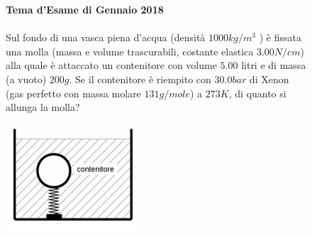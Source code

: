 \begin{figure}[h!]
    \textbf{Tema d'Esame di Gennaio 2018}\\ \\
    Sul fondo di una vasca piena d'acqua (densità $1000 kg/m^3$
    ) è fissata una molla (massa e volume trascurabili, costante elastica $3.00 N/cm$) alla quale è attaccato un contenitore con volume $5.00$ litri e di massa (a vuoto) $200 g$. Se il contenitore è riempito con $30.0 bar$ di Xenon (gas perfetto con massa molare $131 g/mole$) a $273 K$, di quanto si allunga la molla?
    \begin{center}
            \includegraphics[scale=1.1]{ES4/GEN042018.jpg}
        \end{center}
    \end{figure}